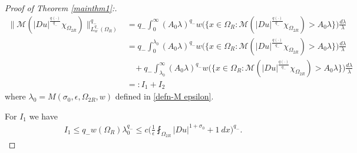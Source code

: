 \documentclass[a4paper,10pt]{amsart}
\newcommand{\f}{\frac}
\newcommand{\Om}{\Omega}
\newcommand{\vc}{\infty}
\begin{document}
	\begin{proof}[Proof of Theorem \ref{mainthm1}:]
		$$
		\begin{aligned}
		\Big\|\mathcal{M}(|Du|^{\f{q(\cdot)}{q_-}}\chi_{\Om_{2R}})\Big\|^{q_-}_{L^{q_-}_w(\Om_{R})}&=q_-\int_0^\vc (A_0\lambda)^{q_-}w\Big(\Big\{x\in \Om_{R}:\mathcal{M}(|Du|^{\f{q(\cdot)}{q_-}}\chi_{\Om_{2R}})>A_0\lambda\Big\}\Big)\f{d\lambda}{\lambda}\\
		&=q_-\int_0^{\lambda_0} (A_0\lambda)^{q_-}w\Big(\Big\{x\in \Om_{R}:\mathcal{M}(|Du|^{\f{q(\cdot)}{q_-}}\chi_{\Om_{2R}})>A_0\lambda\Big\}\Big)\f{d\lambda}{\lambda}\\
		& \ \ \ \ + q_-\int_{\lambda_0}^\vc (A_0\lambda)^{q_-}w\Big(\Big\{x\in \Om_{R}:\mathcal{M}(|Du|^{\f{q(\cdot)}{q_-}}\chi_{\Om_{2R}})>A_0\lambda\Big\}\Big)\f{d\lambda}{\lambda}\\&=: I_1 + I_2
		\end{aligned}
		$$
		where $\lambda_0=M(\sigma_0,\epsilon,\Om_{2R},w)$ defined in \eqref{defn-M epsilon}.
		
		For $I_1$ we have
		$$
		\begin{aligned}
		I_1\leq q_-w(\Om_{R})\lambda_0^{q_-}\leq c\Big(\f{1}{\epsilon}\fint_{\Om_{2R}}|Du|^{1+\sigma_0} + 1 \ dx\Big)^{q_-}.
		\end{aligned}
		$$
		

\end{proof}
\end{document}
